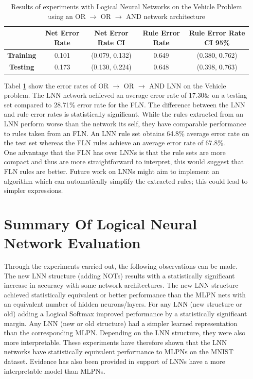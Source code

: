 \begin{table}[H]
	\begin{center}
		\begin{tabular}{| c | c | c | c | c |}
			\hline
			\textbf{} & \textbf{Net Error Rate} & \textbf{Net Error Rate CI} & \textbf{Rule Error Rate} & \textbf{Rule Error Rate CI 95\%}\\
			\hline
			\hline
			\textbf{Training} & 0.101 & (0.079, 0.132) & 0.649 & (0.380, 0.762)\\
			\textbf{Testing} & 0.173 & (0.130, 0.224) & 0.648 & (0.398, 0.763)\\
			\hline
		\end{tabular}
	\end{center}
	\caption{Results of experiments with Logical Neural Networks on the Vehicle Problem using an OR $\rightarrow$ OR $\rightarrow$ AND network architecture}
	\label{tab:vehicle-lnn-peformance}
\end{table}

Tabel \ref{tab:vehicle-lnn-peformance} show the error rates of OR $\rightarrow$ OR $\rightarrow$ AND LNN on the Vehicle problem. The LNN network achieved an average error rate of 17.30\& on a testing set compared to 28.71\% error rate for the FLN. The difference between the LNN and rule error rates is statistically significant. While the rules extracted from an LNN perform worse than the network its self, they have comparable performance to rules taken from an FLN. An LNN rule set obtains 64.8\% average error rate on the test set whereas the FLN rules achieve an average error rate of 67.8\%.\\

One advantage that the FLN has over LNNs is that the rule sets are more compact and thus are more straightforward to interpret, this would suggest that FLN rules are better. Future work on LNNs might aim to implement an algorithm which can automatically simplify the extracted rules; this could lead to simpler expressions.

\section{Summary Of Logical Neural Network Evaluation}
Through the experiments carried out, the following observations can be made. The new LNN structure (adding NOTs) results with a statistically significant increase in accuracy with some network architectures. The new LNN structure achieved statistically equivalent or better performance than the MLPN nets with an equivalent number of hidden neurons/layers. For any LNN (new structure or old) adding a Logical Softmax improved performance by a statistically significant margin. Any LNN (new or old structure) had a simpler learned representation than the corresponding MLPN. Depending on the LNN structure, they were also more interpretable. These experiments have therefore shown that the LNN networks have statistically equivalent performance to MLPNs on the MNIST dataset. Evidence has also been provided in support of LNNs have a more interpretable model than MLPNs.

